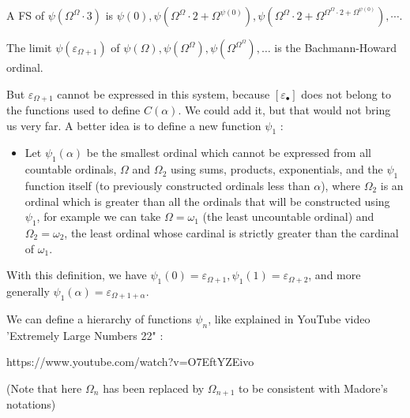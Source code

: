 \documentclass[10pt]{article}
\begin{document}
A FS of \( \psi(\Omega^\Omega \cdot 3) \) is \( \psi(0), \psi(\Omega^\Omega \cdot 2+\Omega^{\psi(0)}), \psi(\Omega^\Omega \cdot 2+\Omega^{\Omega^\Omega \cdot 2+\Omega^{\psi(0)}}), \cdots \).

\bigskip

The limit \( \psi(\varepsilon_{\Omega+1}) \) of \( \psi(\Omega), \psi(\Omega^\Omega), \psi(\Omega^{\Omega^\Omega}), \ldots \) is the Bachmann-Howard ordinal. 

But \( \varepsilon_{\Omega+1} \) cannot be expressed in this system, because \( [ \varepsilon_\bullet ] \) does not belong to the functions used to define \( C(\alpha) \). We could add it, but that would not bring us very far. A better idea is to define a new function \( \psi_1 \) :

\begin{itemize}\item[\hspace{12pt}]

Let \( \psi_1(\alpha) \) be the smallest ordinal which cannot be expressed from all countable ordinals, \( \Omega \) and \( \Omega _{2} \) using sums, products, exponentials, and the \( \psi _{1} \) function itself (to previously constructed ordinals less than \( \alpha \)), where \( \Omega_2 \) is an ordinal which is greater than all the ordinals that will be constructed using \( \psi_1 \), for example we can take \( \Omega = \omega_1 \) (the least uncountable ordinal) and \( \Omega_2 = \omega_2 \), the least ordinal whose cardinal is strictly greater than the cardinal of \( \omega_1 \).

\end{itemize}

With this definition, we have \( \psi_1(0) = \varepsilon_{\Omega+1}, \psi_1(1) = \varepsilon_{\Omega+2} \), and more generally \( \psi_1(\alpha) = \varepsilon_{\Omega+1+\alpha} \).

\bigskip

We can define a hierarchy of functions \( \psi_n \), like explained in YouTube video 'Extremely Large Numbers 22" :

https://www.youtube.com/watch?v=O7EftYZEivo

(Note that here \( \Omega_n \) has been replaced by \( \Omega_{n+1} \) to be consistent with Madore's notations)
\end{document}
